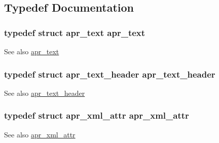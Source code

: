 \subsection{Typedef Documentation}
\subsubsection[{\texorpdfstring{apr\+\_\+text}{apr_text}}]{\setlength{\rightskip}{0pt plus 5cm}typedef struct {\bf apr\+\_\+text} {\bf apr\+\_\+text}}\hypertarget{group__APR__Util__XML_gafddd251818de0015559bc174f81fd743}{}\label{group__APR__Util__XML_gafddd251818de0015559bc174f81fd743}
\begin{DoxySeeAlso}{See also}
\hyperlink{structapr__text}{apr\+\_\+text} 
\end{DoxySeeAlso}
\subsubsection[{\texorpdfstring{apr\+\_\+text\+\_\+header}{apr_text_header}}]{\setlength{\rightskip}{0pt plus 5cm}typedef struct {\bf apr\+\_\+text\+\_\+header} {\bf apr\+\_\+text\+\_\+header}}\hypertarget{group__APR__Util__XML_gaafc6d5ebd59b64a27146cf938a4086e0}{}\label{group__APR__Util__XML_gaafc6d5ebd59b64a27146cf938a4086e0}
\begin{DoxySeeAlso}{See also}
\hyperlink{structapr__text__header}{apr\+\_\+text\+\_\+header} 
\end{DoxySeeAlso}
\subsubsection[{\texorpdfstring{apr\+\_\+xml\+\_\+attr}{apr_xml_attr}}]{\setlength{\rightskip}{0pt plus 5cm}typedef struct {\bf apr\+\_\+xml\+\_\+attr} {\bf apr\+\_\+xml\+\_\+attr}}\hypertarget{group__APR__Util__XML_ga4889d4d353f0ea0dabae2d5ae58dd07e}{}\label{group__APR__Util__XML_ga4889d4d353f0ea0dabae2d5ae58dd07e}
\begin{DoxySeeAlso}{See also}
\hyperlink{structapr__xml__attr}{apr\+\_\+xml\+\_\+attr} 
\end{DoxySeeAlso}
